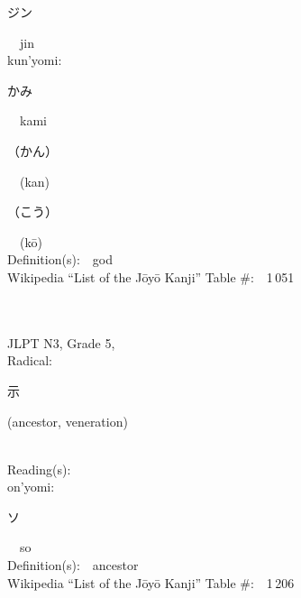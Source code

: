 \begin{multicols}{2}
{\hspace*{2em}}{\begin{CJK}{UTF8}{min} ジン \end{CJK}}\ \ jin\ \ \\
{\hspace*{1em}}kun'yomi:\ \ \\
{\hspace*{2em}}{\begin{CJK}{UTF8}{min} かみ \end{CJK}}\ \ kami\ \ \\
{\hspace*{2em}}{\begin{CJK}{UTF8}{min} （かん） \end{CJK}}\ \ (kan)\ \ \\
{\hspace*{2em}}{\begin{CJK}{UTF8}{min} （こう） \end{CJK}}\ \ (k\=o)\ \ \\
Definition(s):\ \ god \\
Wikipedia ``List of the J\=oy\=o Kanji'' Table \#:\ \ 1\,051 \\
\ \ \\
{\fontsize{34pt}{40pt}  }\ \ \\  %
{JLPT N3, Grade 5, \\Radical:\ \ {\begin{CJK}{UTF8}{min} 示 \end{CJK}} (ancestor, veneration) } \\
Reading(s):\ \ \\
{\hspace*{1em}}on'yomi:\ \ \\
{\hspace*{2em}}{\begin{CJK}{UTF8}{min} ソ \end{CJK}}\ \ so\ \ \\
Definition(s):\ \ ancestor \\
Wikipedia ``List of the J\=oy\=o Kanji'' Table \#:\ \ 1\,206 \\
\ \ \\
{\fontsize{34pt}{40pt}  }\ \ \\  %

\end{multicols}
